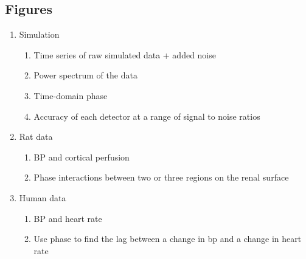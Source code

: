 \documentclass{article}
\begin{document}
	\subsection*{Figures}
	\begin{enumerate}
	\item Simulation
		\begin{enumerate}
		\item Time series of raw simulated data + added noise
		\item Power spectrum of the data
		\item Time-domain phase 
		\item Accuracy of each detector at a range of signal to noise ratios
		\end{enumerate}
	\item Rat data
		\begin{enumerate}
		\item BP and cortical perfusion
		\item Phase interactions between two or three regions on the renal surface
		\end{enumerate}
	\item{Human data}
		\begin{enumerate}
		\item BP and heart rate
		\item Use phase to find the lag between a change in bp and a change in heart rate
		\end{enumerate}
	\end{enumerate}
	
\end{document}

